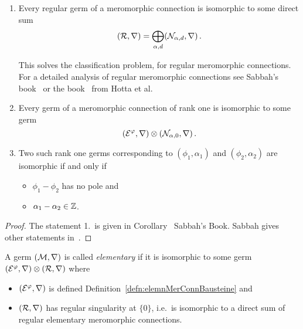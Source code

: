 \begin{prop}
  \begin{enumerate}
    \item
      Every regular germ of a meromorphic connection is isomorphic to some
      direct sum
      \[
        (\mathcal{R},\nabla)=\bigoplus_{\alpha,d}(\mathcal{N}_{\alpha,d},\nabla)\,.
      \]
      \begin{s-rem}
        This solves the classification problem, for regular meromorphic
        connections.
        For a detailed analysis of regular meromorphic connections
        see Sabbah's book~\cite[Sec.II.2]{sabbah2007isomonodromic} or
        the book~\cite[Sec.5.2]{hotta2008} from Hotta et al.
      \end{s-rem}
    \item Every germ of a meromorphic connection of rank one is isomorphic to
      some germ
      \[
        (\mathcal{E}^\varphi,\nabla)\otimes(\mathcal{N}_{\alpha,0},\nabla) \,.
      \]
    \item Two such rank one germs corresponding to $(\phi_1,\alpha_1)$ and
      $(\phi_2,\alpha_2)$ are isomorphic if and only if
      \begin{itemize}
        \item $\phi_1-\phi_2$ has no pole and
        \item $\alpha_1-\alpha_2\in\mathbb{Z}$.
      \end{itemize}
  \end{enumerate}
\end{prop}
\begin{proof}
  The statement 1.\ is given in
  Corollary~\cite[Cor.II.2.9]{sabbah2007isomonodromic} Sabbah's Book.
  Sabbah gives other statements in~\cite[Prop.II.5.1]{sabbah2007isomonodromic}.
\end{proof}
\begin{defn}
  A germ $(\mathcal{M},\nabla)$ is called \emph{elementary} if it is isomorphic to
  some germ $(\mathcal{E}^\varphi,\nabla)\otimes(\mathcal{R},\nabla)$ where
  \begin{itemize}
    \item $(\mathcal{E}^\varphi,\nabla)$ is defined 
      Definition~\ref{defn:elemnMerConnBausteine} and
    \item $(\mathcal{R},\nabla)$ has regular singularity at $\{0\}$, i.e.\ is
      isomorphic to a direct sum of regular elementary meromorphic connections.
  \end{itemize}
\end{defn}
